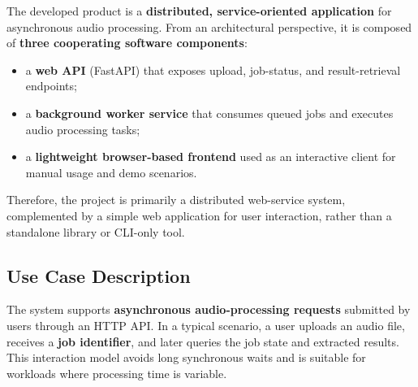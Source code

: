\documentclass{scrartcl}
\begin{document}
The developed product is a \textbf{distributed, service-oriented application} for asynchronous audio processing.
From an architectural perspective, it is composed of \textbf{three cooperating software components}:

\begin{itemize}
  \item a \textbf{web API} (FastAPI) that exposes upload, job-status, and result-retrieval endpoints;
  \item a \textbf{background worker service} that consumes queued jobs and executes audio processing tasks;
  \item a \textbf{lightweight browser-based frontend} used as an interactive client for manual usage and demo scenarios.
\end{itemize}

Therefore, the project is primarily a distributed web-service system, complemented by a simple web application for user interaction, rather than a standalone library or CLI-only tool.

\subsection*{Use Case Description}


The system supports \textbf{asynchronous audio-processing requests} submitted by users through an HTTP API.
In a typical scenario, a user uploads an audio file, receives a \textbf{job identifier}, and later queries the job state and extracted results.
This interaction model avoids long synchronous waits and is suitable for workloads where processing time is variable.
\end{document}
